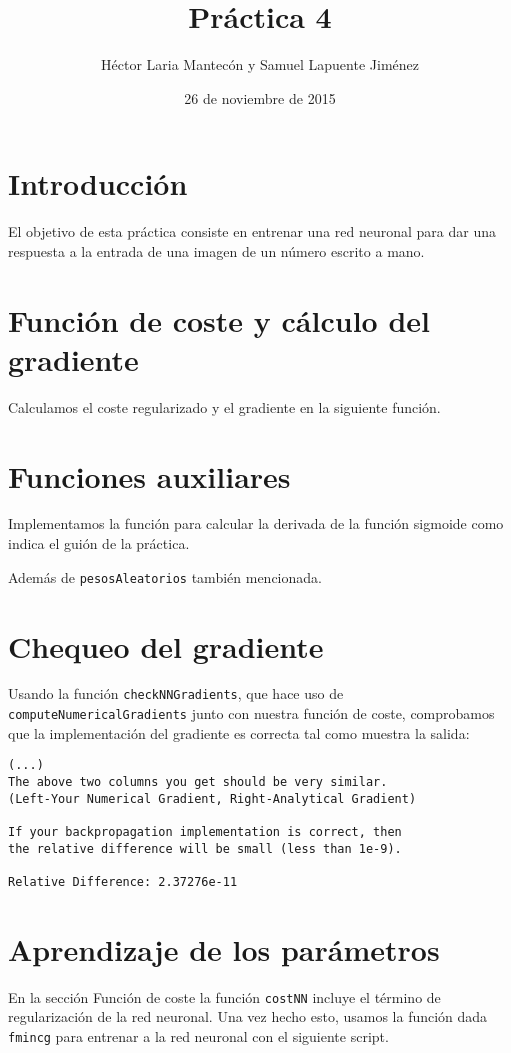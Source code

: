 \documentclass{article}
\title{Práctica 4}
\author{Héctor Laria Mantecón y Samuel Lapuente Jiménez}
\date{26 de noviembre de 2015}
\begin{document}
\maketitle

\section{Introducción}
El objetivo de esta práctica consiste en entrenar una red neuronal para dar una respuesta a la entrada de una imagen de un número escrito a mano.

\section{Función de coste y cálculo del gradiente}
Calculamos el coste regularizado y el gradiente en la siguiente función.


\section{Funciones auxiliares}
Implementamos la función para calcular la derivada de la función sigmoide como indica el guión de la práctica.

Además de {\tt pesosAleatorios} también mencionada.


\pagebreak
\section{Chequeo del gradiente}
Usando la función {\tt checkNNGradients}, que hace uso de {\tt computeNumericalGradients} junto con nuestra función de coste, comprobamos que la implementación del gradiente es correcta tal como muestra la salida:
\begin{lstlisting}[style=output]
(...)
The above two columns you get should be very similar.
(Left-Your Numerical Gradient, Right-Analytical Gradient)

If your backpropagation implementation is correct, then
the relative difference will be small (less than 1e-9).

Relative Difference: 2.37276e-11
\end{lstlisting}

\section{Aprendizaje de los parámetros}
En la sección Función de coste la función {\tt costNN} incluye el término de regularización de la red neuronal.
Una vez hecho esto, usamos la función dada {\tt fmincg} para entrenar a la red neuronal con el siguiente script.

\end{document}
